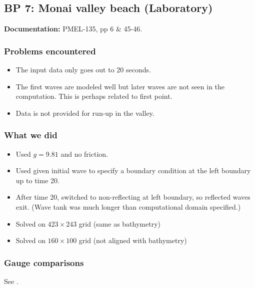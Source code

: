 
\subsection{BP 7:
 Monai valley beach (Laboratory)}

{\bf Documentation:}  PMEL-135, pp 6 \& 45-46.

\subsubsection{Problems encountered}

\begin{itemize}
\item The input data only goes out to 20 seconds.

\item The first waves are modeled well but later waves are not seen in the
computation.  This is perhaps related to first point.  

\item Data is not provided for run-up in the valley.
\end{itemize}

\subsubsection{What we did}

\begin{itemize}
\item Used $g=9.81$ and no friction.
\item Used given initial wave to specify a boundary condition at the left
boundary up to time 20.
\item After time 20, switched to non-reflecting at left boundary, so
reflected waves exit.  
(Wave tank was much longer than computational domain specified.)
\item Solved on $423\times 243$ grid (same as bathymetry)
\item Solved on $160\times 100$ grid (not aligned with bathymetry)
\end{itemize} 

\subsubsection{Gauge comparisons}

See .


